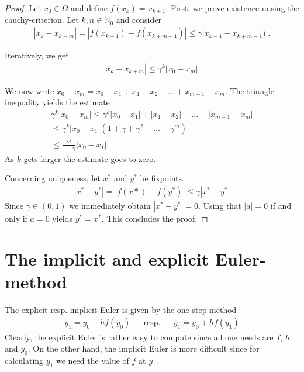 \begin{proof}
	Let $x_0 \in \Omega$ and define $f(x_k) = x_{k+1}$. First, we prove
	existence unsing the cauchy-criterion. Let $k, n \in \mathbb N_0$ and consider
	\begin{gather*}
	|x_k - x_{k+m} | = |f(x_{k-1}) - f(x_{k+m-1})| \le \gamma |x_{k-1} - x_{k+m-1})|.
	\end{gather*}

	Iteratively, we get
	\begin{gather*}
	|x_k - x_{k+m} | \le \gamma^k |x_0 - x_m|.
	\end{gather*}

	We now write $x_0 - x_m = x_0 - x_1 + x_1 - x_2 + \dots + x_{m-1} - x_m$.
	The triangle-inequality yields the estimate
	\begin{gather*}
	\gamma^k |x_0 - x_m| \le \gamma^k |x_0 - x_1| + |x_1 - x_2| + \dots + |x_{m-1} - x_m|  \\
	\le \gamma^k |x_0 - x_1| (1 + \gamma + \gamma ^2 + \dots + \gamma^m) \\
	\le \frac{\gamma^k}{1-\gamma} |x_0 - x_1|.
	\end{gather*}
	As $k$ gets larger the estimate goes to zero.

	Concerning uniqueness, let $x^*$ and $y^*$ be fixpoints.
	\begin{gather*}
	|x^* - y^*| = |f(x*) - f(y^*) | \le \gamma |x^* - y^*|
	\end{gather*}
	Since $\gamma \in (0,1)$ we immediately obtain $|x^* - y^*| = 0$. Using
	that $|a| = 0$ if and only if $a=0$ yields $y^* = x^*$. This concludes the proof.
\end{proof}

\section{The implicit and explicit Euler-method}

	The explicit resp. implicit Euler is given by the one-step method
	\begin{align*}
	&& y_1 = y_0 + h f(y_0) && \text{resp.} && y_1 = y_0 + h f(y_1) &&
	\end{align*}
	Clearly, the explicit Euler is rather easy to compute since all one
	needs are $f$, $h$ and $y_0$. On the other hand, the implicit Euler
	is more difficult since for calculating $y_1$ we need the value of $f$ at $y_1$.

